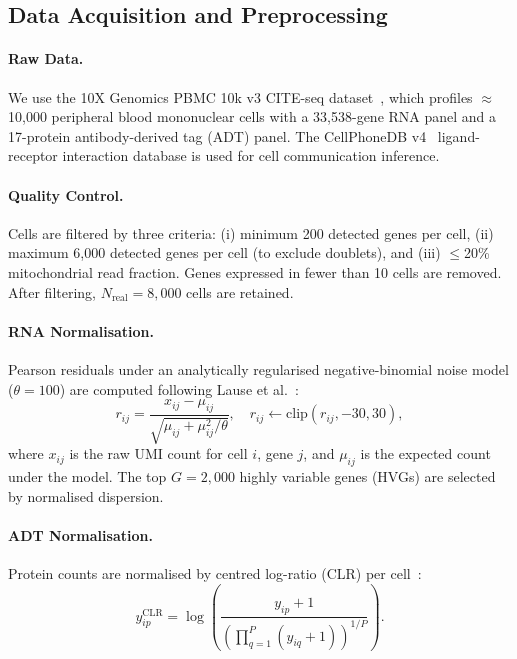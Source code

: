 \documentclass[11pt,a4paper]{article}
\begin{document}
\subsection{Data Acquisition and Preprocessing}\label{ssec:preprocessing}

\paragraph{Raw Data.}
We use the 10X Genomics PBMC 10k v3 CITE-seq dataset~\citep{10xpbmc10k}, which profiles $\approx$10,000 peripheral blood mononuclear cells with a 33,538-gene RNA panel and a 17-protein antibody-derived tag (ADT) panel.
The CellPhoneDB v4~\citep{cellphonedb2021} ligand-receptor interaction database is used for cell communication inference.

\paragraph{Quality Control.}
Cells are filtered by three criteria: (i) minimum 200 detected genes per cell, (ii) maximum 6,000 detected genes per cell (to exclude doublets), and (iii) $\leq$20\% mitochondrial read fraction.
Genes expressed in fewer than 10 cells are removed.
After filtering, $N_{\text{real}} = 8{,}000$ cells are retained.

\paragraph{RNA Normalisation.}
Pearson residuals under an analytically regularised negative-binomial noise model ($\theta=100$) are computed following Lause et al.~\citep{lause2021}:
\begin{equation}\label{eq:pearson}
  r_{ij} = \frac{x_{ij} - \mu_{ij}}{\sqrt{\mu_{ij} + \mu_{ij}^2/\theta}}, \quad
  r_{ij} \leftarrow \text{clip}(r_{ij}, -30, 30),
\end{equation}
where $x_{ij}$ is the raw UMI count for cell $i$, gene $j$, and $\mu_{ij}$ is the expected count under the model.
The top $G=2{,}000$ highly variable genes (HVGs) are selected by normalised dispersion.

\paragraph{ADT Normalisation.}
Protein counts are normalised by centred log-ratio (CLR) per cell~\citep{hao2021}:
\begin{equation}\label{eq:clr}
  y_{ip}^{\text{CLR}} = \log\!\left(\frac{y_{ip} + 1}{\left(\prod_{q=1}^{P}(y_{iq}+1)\right)^{1/P}}\right).
\end{equation}
\end{document}

